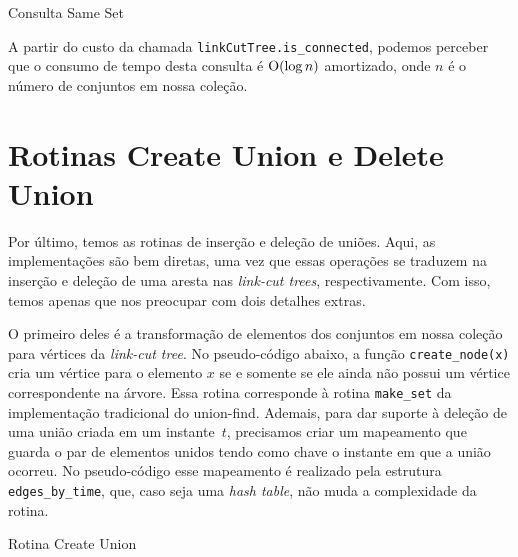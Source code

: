 \begin{algorithm}[h!]
    \caption{Consulta Same Set}\label{uf:same-set}
    \begin{algorithmic}[1]
        \State {}
        \EndIf
        \State {}
        \EndFunction
    \end{algorithmic}
\end{algorithm}

A partir do custo da chamada \texttt{linkCutTree.is\_connected}, podemos perceber que o consumo de tempo desta consulta é $\mathrm{O}(\log n)$ amortizado, onde $n$ é o número de conjuntos em nossa coleção.

\section{Rotinas Create Union e Delete Union}
\label{sec:uf-union}

Por último, temos as rotinas de inserção e deleção de uniões. Aqui, as implementações são bem diretas, uma vez que essas operações se traduzem na inserção e deleção de uma aresta nas \emph{link-cut trees}, respectivamente. Com isso, temos apenas que nos preocupar com dois detalhes extras.

O primeiro deles é a transformação de elementos dos conjuntos em nossa coleção para vértices da \emph{link-cut tree}. No pseudo-código abaixo, a função \texttt{create\_node(x)} cria um vértice para o elemento $x$ se e somente se ele ainda não possui um vértice correspondente na árvore. Essa rotina corresponde à rotina \texttt{make\_set} da implementação tradicional do union-find. Ademais, para dar suporte à deleção de uma união criada em um instante~$t$, precisamos criar um mapeamento que guarda o par de elementos unidos tendo como chave o instante em que a união ocorreu. No pseudo-código esse mapeamento é realizado pela estrutura \texttt{edges\_by\_time}, que, caso seja uma \emph{hash table}, não muda a complexidade da rotina.

\begin{algorithm}[h!]
    \caption{Rotina Create Union}\label{uf:create-union}
    \begin{algorithmic}[1]
        \EndFunction
    \end{algorithmic}
\end{algorithm}

